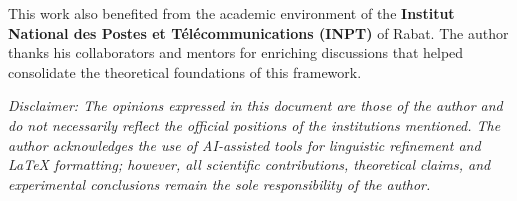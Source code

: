 \documentclass[letterpaper]{article}
\begin{document}
This work also benefited from the academic environment of the
\textbf{Institut National des Postes et T\'el\'ecommunications (INPT)}
of Rabat. The author thanks his collaborators and mentors for enriching
discussions that helped consolidate the theoretical foundations of this
framework.

\smallskip
\noindent\textit{Disclaimer: The opinions expressed in this document
are those of the author and do not necessarily reflect the official
positions of the institutions mentioned. The author acknowledges the
use of AI-assisted tools for linguistic refinement and \LaTeX{}
formatting; however, all scientific contributions, theoretical claims,
and experimental conclusions remain the sole responsibility of the
author.}


\end{document}
